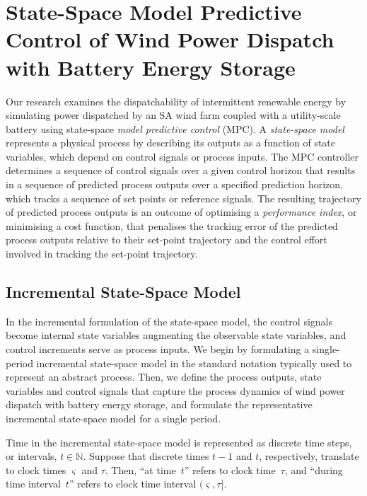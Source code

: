 \documentclass[3p,times,procedia]{elsarticle}
\def\N{\mathbb{N}}
\begin{document}
\section{State-Space Model Predictive Control of Wind Power Dispatch with Battery Energy Storage}\label{sect:ssmpc_dispatch}
Our research examines the dispatchability of intermittent renewable energy by simulating power dispatched by an SA wind farm coupled with a utility-scale battery using state-space \textit{model predictive control} (MPC).  A \textit{state-space model} represents a physical process by describing its outputs as a function of state variables, which depend on control signals or process inputs.  The MPC controller determines a sequence of control signals over a given control horizon that results in a sequence of predicted process outputs over a specified prediction horizon, which tracks a sequence of set points or reference signals.  The resulting trajectory of predicted process outputs is an outcome of optimising a \textit{performance index}, or minimising a cost function, that penalises the tracking error of the predicted process outputs relative to their set-point trajectory and the control effort involved in tracking the set-point trajectory.  

\subsection{Incremental State-Space Model}\label{sect:state_space_model}
In the incremental formulation of the state-space model, the control signals become internal state variables augmenting the observable state variables, and control increments serve as process inputs.  We begin by formulating a single-period incremental state-space model in the standard notation typically used to represent an abstract process.  Then, we define the process outputs, state variables and control signals that capture the process dynamics of wind power dispatch with battery energy storage, and formulate the representative incremental state-space model for a single period.

Time in the incremental state-space model is represented as discrete time steps, or intervals, $t\in\N$.  Suppose that discrete times $t\!-\!1$ and $t$, respectively, translate to clock times $\varsigma$ and $\tau$.  Then, ``at time~$t$'' refers to clock time~$\tau$, and ``during time interval~$t$'' refers to clock time interval $(\varsigma, \tau]$.
\end{document}

